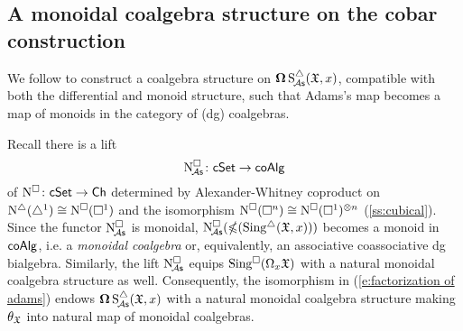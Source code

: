 \subsection{A monoidal coalgebra structure on the cobar construction}

We follow \cite{baues1998hopf} to construct a coalgebra structure on $\cobar \sSchainsA(\fX,x)$, compatible with both the differential and monoid structure, such that Adams's map becomes a map of monoids in the category of (dg) coalgebras.  

Recall there is a lift 
\[
\cchainsA \colon \cSet \to \coAlg
\]
of $\cchains \colon \cSet \to \Ch$ determined by Alexander-Whitney coproduct on $\schains(\simplex^1) \cong \cchains(\cube^1)$ and the isomorphism $\cchains(\cube^n)\cong \cchains(\cube^1)^{\otimes n}$ (\cref{ss:cubical}). Since the functor $\cchainsA$ is monoidal, $\cchainsA( \ccobar(\sSing(\fX,x)))$ becomes a monoid in $\coAlg$, i.e. a \textit{monoidal coalgebra} or, equivalently, an associative coassociative dg bialgebra. Similarly, the lift $\cchainsA$ equips $\cSing(\loops_x \fX)$ with a natural monoidal coalgebra structure as well. Consequently, the isomorphism in (\ref{e:factorization of adams}) endows $\cobar \sSchainsA(\fX,x)$ with a natural monoidal coalgebra structure making $\theta_\fX$ into natural map of monoidal coalgebras. 
